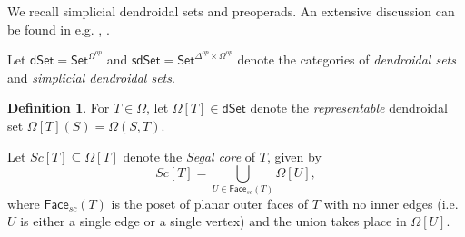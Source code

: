 \documentclass[a4paper,10pt
,draft
]{article}%
\numberwithin{equation}{section}
\numberwithin{figure}{section}
\theoremstyle{definition} %
\newtheorem{definition}[equation]{Definition}%
\newcommand{\set}[1]{\left\{#1\right\}}%
\newcommand{\Set}{\ensuremath{\mathsf{Set}}}
\newcommand{\sSet}{\ensuremath{\mathsf{sSet}}}%
\newcommand{\Cat}{\mathsf{Cat}}
\newcommand{\Op}{\mathsf{Op}}%
\newcommand{\sOp}{\ensuremath{\mathsf{sOp}}}%
\newcommand{\dSet}{\mathsf{dSet}}
\newcommand{\sdSet}{\mathsf{sdSet}}
\newcommand{\PreOp}{\mathsf{PreOp}}
\DeclareMathOperator{\Hom}{Hom}%
\renewcommand{\O}{\ensuremath{\mathcal O}}
\newcommand{\1}{\ensuremath{\mathbbm 1}}%
\begin{document}
We recall simplicial dendroidal sets and preoperads.
An extensive discussion can be found in
e.g. \cite[\S 4]{BP_edss}, \cite[\S \ref{TAS-JT_SEC}, \S \ref{TAS-SPREOP_SEC}]{BP_TAS}.





Let $\dSet = \Set^{\Omega^{op}}$ and $\sdSet = \Set^{\Delta^{op} \times \Omega^{op}}$
denote the categories of \textit{dendroidal sets} and \textit{simplicial dendroidal sets}.

\begin{definition}
        For $T \in \Omega$, let $\Omega[T] \in \dSet$ denote the \textit{representable} dendroidal set
        $\Omega[T](S) = \Omega(S,T)$.

        Let $Sc[T] \subseteq \Omega[T]$ denote the \textit{Segal core} of $T$, given by
        \[
                Sc[T] = \bigcup_{U \in \mathsf{Face}_{sc}(T)} \Omega[U],
        \]
        where
        $\mathsf{Face}_{sc}(T)$ is the poset of planar outer faces of $T$ with no inner edges
        (i.e. $U$ is either a single edge or a single vertex)
        and the union takes place in $\Omega[U]$.
\end{definition}
\end{document}
